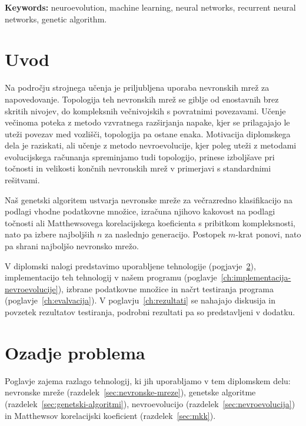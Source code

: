 \documentclass[a4paper,12pt,openright]{book}
\newcommand{\tkeywordsEn}{neuroevolution, machine learning, neural networks, recurrent neural networks, genetic algorithm}
\newcommand{\clearemptydoublepage}{\newpage{\pagestyle{empty}\cleardoublepage}}
\begin{document}
    \noindent\textbf{Keywords:} \tkeywordsEn.
    \clearemptydoublepage

    \mainmatter
    \setcounter{page}{1}
    \pagestyle{fancy}

    \chapter{Uvod}\label{ch:uvod}
    Na področju strojnega učenja je priljubljena uporaba nevronskih mrež za napovedovanje.
    Topologija teh nevronskih mrež se giblje od enostavnih brez skritih nivojev, do kompleksnih večnivojskih
    s povratnimi povezavami.
    Učenje večinoma poteka z metodo vzvratnega razširjanja napake, kjer se prilagajajo le uteži povezav med vozlišči,
    topologija pa ostane enaka.
    Motivacija diplomskega dela je raziskati, ali učenje z metodo nevroevolucije, kjer poleg uteži z metodami evolucijskega
    računanja spreminjamo tudi topologijo, prinese izboljšave pri točnosti in velikosti končnih nevronskih
    mrež v primerjavi s standardnimi rešitvami.

    Naš genetski algoritem ustvarja nevronske mreže za večrazredno klasifikacijo na podlagi vhodne
    podatkovne množice, izračuna njihovo kakovost na podlagi toč\-no\-sti ali Matthewsovega korelacijskega koeficienta s pribitkom kompleksnosti,
    nato pa izbere najboljših $n$ za naslednjo generacijo.
    Postopek $m$-krat ponovi, nato pa shrani najboljšo nevronsko mrežo.

    V diplomski nalogi predstavimo uporabljene tehnologije (pogjavje~\ref{ch:ozadje-problema}), implementacijo teh
    tehnologij v našem programu (poglavje~\ref{ch:implementacija-nevroevolucije}), izbrane podatkovne množice in
    načrt testiranja programa (poglavje~\ref{ch:evalvacija}).
    V poglavju~\ref{ch:rezultati} se nahajajo diskusija in povzetek rezultatov testiranja, podrobni rezultati pa so predstavljeni v dodatku.


    \chapter{Ozadje problema}\label{ch:ozadje-problema}
    Poglavje zajema razlago tehnologij, ki jih uporabljamo v tem diplomskem delu: nevronske mreže (razdelek~\ref{sec:nevronske-mreze}),
    genetske algoritme (razdelek~\ref{sec:genetski-algoritmi}), nevroevolucijo (razdelek~\ref{sec:nevroevolucija}) in
    Matthewsov korelacijski koeficient (razdelek~\ref{sec:mkk}).
\end{document}
